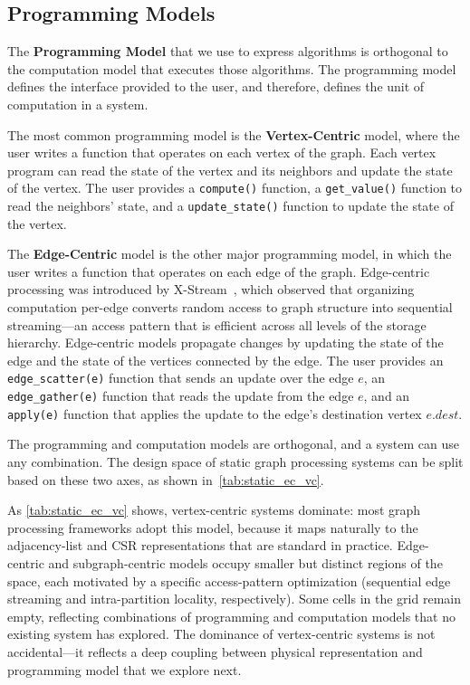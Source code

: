 \subsection{Programming Models}
\label{design:prog_models}

The \textbf{Programming Model} that we use to express algorithms is orthogonal to the computation model that executes those algorithms.
The programming model defines the interface provided to the user, and therefore, defines the unit of computation in a system.

The most common programming model is the \textbf{Vertex-Centric} model, where the user writes a function that operates on each vertex of the graph.
Each vertex program can read the state of the vertex and its neighbors and update the state of the vertex.
The user provides a \texttt{compute()} function, a \texttt{get\_value()} function to read the neighbors' state, and a \texttt{update\_state()} function to update the state of the vertex.

The \textbf{Edge-Centric} model is the other major programming model, in which the user writes a function that operates on each edge of the graph.
Edge-centric processing was introduced by X-Stream~\cite{roy2013x}, which observed that organizing computation per-edge converts random access to graph structure into sequential streaming---an access pattern that is efficient across all levels of the storage hierarchy.
Edge-centric models propagate changes by updating the state of the edge and the state of the vertices connected by the edge.
The user provides an \texttt{edge\_scatter(e)} function that sends an update over the edge $e$, an \texttt{edge\_gather(e)} function that reads the update from the edge $e$, and an \texttt{apply(e)} function that applies the update to the edge's destination vertex $e.dest$.

The programming and computation models are orthogonal, and a system can use any combination.
The design space of static graph processing systems can be split based on these two axes, as shown in~\autoref{tab:static_ec_vc}.
\begin{table}[t]
    \centering
    \small
    
    \caption{Design space of static graph processing systems classified by programming model (columns) and computation model (rows). Hybrid systems are noted below the table.}
    \label{tab:static_ec_vc}
\end{table}

As \autoref{tab:static_ec_vc} shows, vertex-centric systems dominate: most graph processing frameworks adopt this model, because it maps naturally to the adjacency-list and CSR representations that are standard in practice.
Edge-centric and subgraph-centric models occupy smaller but distinct regions of the space, each motivated by a specific access-pattern optimization (sequential edge streaming and intra-partition locality, respectively).
Some cells in the grid remain empty, reflecting combinations of programming and computation models that no existing system has explored.
The dominance of vertex-centric systems is not accidental---it reflects a deep coupling between physical representation and programming model that we explore next.

